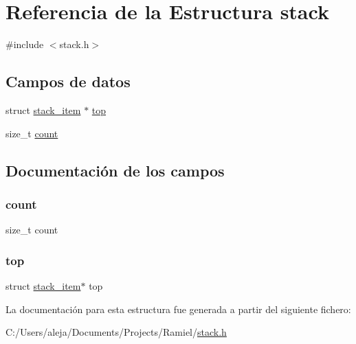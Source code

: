\hypertarget{structstack}{}\section{Referencia de la Estructura stack}
\label{structstack}


{\ttfamily \#include $<$stack.\+h$>$}

\subsection*{Campos de datos}
\begin{DoxyCompactItemize}
\item 
struct \mbox{\hyperlink{structstack__item}{stack\+\_\+item}} $\ast$ \mbox{\hyperlink{structstack_abbdb42d3275da0ecf50fcd23a99c7e5b}{top}}
\item 
size\+\_\+t \mbox{\hyperlink{structstack_a76d971a3c552bc58ba9f0d5fceae9806}{count}}
\end{DoxyCompactItemize}


\subsection{Documentación de los campos}
\mbox{\label{structstack_a76d971a3c552bc58ba9f0d5fceae9806}} 
\subsubsection{\texorpdfstring{count}{count}}
{\footnotesize\ttfamily size\+\_\+t count}

\mbox{\label{structstack_abbdb42d3275da0ecf50fcd23a99c7e5b}} 
\subsubsection{\texorpdfstring{top}{top}}
{\footnotesize\ttfamily struct \mbox{\hyperlink{structstack__item}{stack\+\_\+item}}$\ast$ top}



La documentación para esta estructura fue generada a partir del siguiente fichero\+:\begin{DoxyCompactItemize}
\item 
C\+:/\+Users/aleja/\+Documents/\+Projects/\+Ramiel/\mbox{\hyperlink{stack_8h}{stack.\+h}}\end{DoxyCompactItemize}

